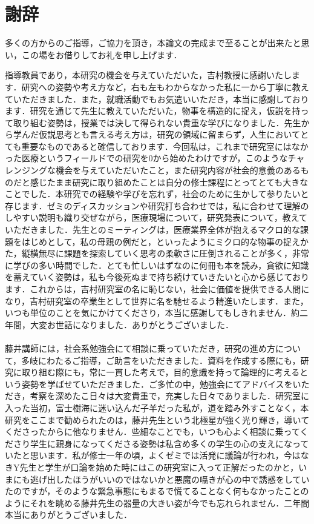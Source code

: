 \chapter{謝辞}

多くの方からのご指導，ご協力を頂き，本論文の完成まで至ることが出来たと思い，この場をお借りしてお礼を申し上げます．

指導教員であり，本研究の機会を与えていただいた，吉村教授に感謝いたします．研究への姿勢や考え方など，右も左もわからなかった私に一から丁寧に教えていただきました．また，就職活動でもお気遣いいただき，本当に感謝しております．研究を通じて先生に教えていただいた，物事を構造的に捉え，仮説を持って取り組む姿勢は，授業では決して得られない貴重な学びになりました．先生から学んだ仮説思考とも言える考え方は，研究の領域に留まらず，人生においてとても重要なものであると確信しております．今回私は，これまで研究室にはなかった医療というフィールドでの研究を0から始めたわけですが，このようなチャレンジングな機会を与えていただいたこと，また研究内容が社会的意義のあるものだと感じたまま研究に取り組めたことは自分の修士課程にとってとても大きなことでした．本研究での経験や学びを忘れず，社会のために生かして参りたいと存じます．ゼミのディスカッションや研究打ち合わせでは，私に合わせて理解のしやすい説明も織り交ぜながら，医療現場について，研究発表について，教えていただきました．先生とのミーティングは，医療業界全体が抱えるマクロ的な課題をはじめとして，私の母親の例だと，といったようにミクロ的な物事の捉えかた，縦横無尽に課題を探索していく思考の柔軟さに圧倒されることが多く，非常に学びの多い時間でした．とても忙しいはずなのに何冊も本を読み，貪欲に知識を蓄えていく姿勢は，私も今後死ぬまで持ち続けていきたいと心から感じております．これからは，吉村研究室の名に恥じない，社会に価値を提供できる人間になり，吉村研究室の卒業生として世界に名を馳せるよう精進いたします．また，いつも単位のことを気にかけてくださり，本当に感謝してもしきれません．約二年間，大変お世話になりました．ありがとうございました．\\
\\
\quad 藤井講師には，社会系勉強会にて相談に乗っていただき，研究の進め方について，多岐にわたるご指導，ご助言をいただきました．資料を作成する際にも，研究に取り組む際にも，常に一貫した考えで，目的意識を持って論理的に考えるという姿勢を学ばせていただきました．ご多忙の中，勉強会にてアドバイスをいただき，考察を深めたこ日々は大変貴重で，充実した日々でありました．研究室に入った当初，富士樹海に迷い込んだ子羊だった私が，道を踏み外すことなく，本研究をここまで勧められたのは，藤井先生という北極星が強く光り輝き，導いてくださったからに他なりません．些細なことでも，いつも心よく相談に乗ってくださり学生に親身になってくださる姿勢は私含め多くの学生の心の支えになっていたと思います．私が修士一年の頃，よくゼミでは活発に議論が行われ，今はなきY先生と学生が口論を始めた時にはこの研究室に入って正解だったのかと，いまにも逃げ出したほうがいいのではないかと悪魔の囁きが心の中で誘惑をしていたのですが，そのような緊急事態にもまるで慌てることなく何もなかったことのようにそれを眺める藤井先生の器量の大きい姿が今でも忘れられません．二年間本当にありがとうございました．\\
